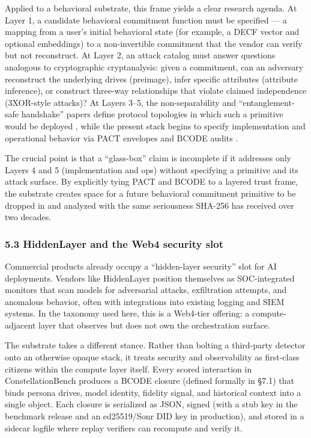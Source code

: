 Applied to a behavioral substrate, this frame yields a clear research
agenda. At Layer 1, a candidate behavioral commitment function must be
specified --- a mapping from a user's initial behavioral state (for
example, a DECF vector and optional embeddings) to a non-invertible
commitment that the vendor can verify but not reconstruct. At Layer 2,
an attack catalog must answer questions analogous to cryptographic
cryptanalysis: given a commitment, can an adversary reconstruct the
underlying drives (preimage), infer specific attributes (attribute
inference), or construct three-way relationships that violate claimed
independence (3XOR-style attacks)? At Layers 3--5, the non-separability
and ``entanglement-safe handshake'' papers define protocol topologies in
which such a primitive would be deployed
\citep{wp2_entanglement_safe_handshake}, while the present stack begins
to specify implementation and operational behavior via PACT envelopes
and BCODE audits \citep{pact_protocol_spec}.

The crucial point is that a ``glass-box'' claim is incomplete if it
addresses only Layers 4 and 5 (implementation and ops) without
specifying a primitive and its attack surface. By explicitly tying PACT
and BCODE to a layered trust frame, the substrate creates space for a
future behavioral commitment primitive to be dropped in and analyzed
with the same seriousness SHA-256 has received over two decades.

\subsubsection{5.3 HiddenLayer and the Web4 security
slot}\label{hiddenlayer-and-the-web4-security-slot}

Commercial products already occupy a ``hidden-layer security'' slot for
AI deployments. Vendors like HiddenLayer \citep{hiddenlayer} position
themselves as SOC-integrated monitors that scan models for adversarial
attacks, exfiltration attempts, and anomalous behavior, often with
integrations into existing logging and SIEM systems. In the taxonomy
used here, this is a Web4-tier offering: a compute-adjacent layer that
observes but does not own the orchestration surface.

The substrate takes a different stance. Rather than bolting a
third-party detector onto an otherwise opaque stack, it treats security
and observability as first-class citizens within the compute layer
itself. Every scored interaction in ConstellationBench produces a BCODE
closure (defined formally in §7.1) that binds persona drives, model
identity, fidelity signal, and historical context into a single object.
Each closure is serialized as JSON, signed (with a stub key in the
benchmark release and an ed25519/Sonr DID key in production), and stored
in a sidecar logfile where replay verifiers can recompute and verify it.

